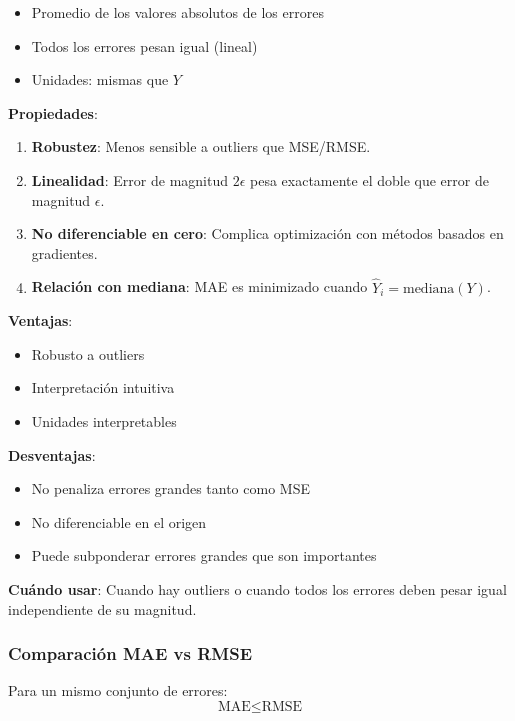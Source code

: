 \documentclass[
  doc,
  floatsintext,
  longtable,
  a4paper,
  nolmodern,
  notxfonts,
  notimes,
  12pt,
  colorlinks=true,linkcolor=blue,citecolor=blue,urlcolor=blue]{apa7}
\providecommand{\tightlist}{%
  \setlength{\itemsep}{0pt}\setlength{\parskip}{0pt}}
\begin{document}
\begin{itemize}
\tightlist
\item
  Promedio de los valores absolutos de los errores
\item
  Todos los errores pesan igual (lineal)
\item
  Unidades: mismas que \(Y\)
\end{itemize}

\textbf{Propiedades}:

\begin{enumerate}
\def\labelenumi{\arabic{enumi}.}
\item
  \textbf{Robustez}: Menos sensible a outliers que MSE/RMSE.
\item
  \textbf{Linealidad}: Error de magnitud \(2\epsilon\) pesa exactamente
  el doble que error de magnitud \(\epsilon\).
\item
  \textbf{No diferenciable en cero}: Complica optimización con métodos
  basados en gradientes.
\item
  \textbf{Relación con mediana}: MAE es minimizado cuando
  \(\hat{Y}_i = \text{mediana}(Y)\).
\end{enumerate}

\textbf{Ventajas}:

\begin{itemize}
\tightlist
\item
  Robusto a outliers
\item
  Interpretación intuitiva
\item
  Unidades interpretables
\end{itemize}

\textbf{Desventajas}:

\begin{itemize}
\tightlist
\item
  No penaliza errores grandes tanto como MSE
\item
  No diferenciable en el origen
\item
  Puede subponderar errores grandes que son importantes
\end{itemize}

\textbf{Cuándo usar}: Cuando hay outliers o cuando todos los errores
deben pesar igual independiente de su magnitud.

\subsubsection{Comparación MAE vs
RMSE}\label{comparaciuxf3n-mae-vs-rmse}

Para un mismo conjunto de errores: \[
\text{MAE} \leq \text{RMSE}
\]
\end{document}
